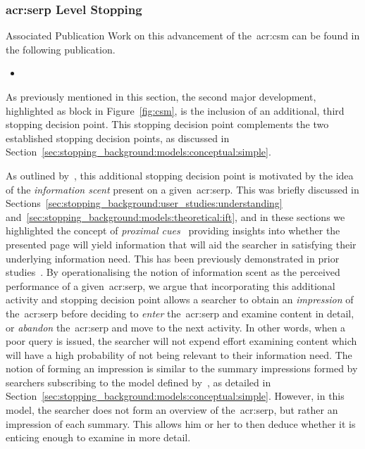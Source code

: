 \subsubsection{\gls{acr:serp} Level Stopping}\label{sec:csm:new_stopping}
\begin{publications_box}{Associated Publication}
Work on this advancement of the~\gls{acr:csm} can be found in the following publication.
\vspace*{-2mm}
\begin{itemize}
    \item{}
\end{itemize}
\end{publications_box}

As previously mentioned in this section, the second major development, highlighted as block  in Figure~\ref{fig:csm}, is the inclusion of an additional, third stopping decision point. This stopping decision point complements the two established stopping decision points, as discussed in Section~\ref{sec:stopping_background:models:conceptual:simple}.

As outlined by~\cite{maxwell2018serp}, this additional stopping decision point is motivated by the idea of the \emph{information scent} present on a given~\gls{acr:serp}. This was briefly discussed in Sections~\ref{sec:stopping_background:user_studies:understanding} and~\ref{sec:stopping_background:models:theoretical:ift}, and in these sections we highlighted the concept of \emph{proximal cues}~\citep{chi2001information_scent} providing insights into whether the presented page will yield information that will aid the searcher in satisfying their underlying information need. This has been previously demonstrated in prior studies~\citep{wu2014information_scent, ong2017scent_behaviour, maxwell2017snippets}. By operationalising the notion of information scent as the perceived performance of a given~\gls{acr:serp}, we argue that incorporating this additional activity and stopping decision point allows a searcher to obtain an \emph{impression} of the~\gls{acr:serp} before deciding to \emph{enter} the~\gls{acr:serp} and examine content in detail, or \emph{abandon} the~\gls{acr:serp} and move to the next activity. In other words, when a poor query is issued, the searcher will not expend effort examining content which will have a high probability of not being relevant to their information need. The notion of forming an impression is similar to the summary impressions formed by searchers subscribing to the model defined by~\cite{thomas2014modelling_behaviour}, as detailed in Section~\ref{sec:stopping_background:models:conceptual:simple}. However, in this model, the searcher does not form an overview of the~\gls{acr:serp}, but rather an impression of each summary. This allows him or her to then deduce whether it is enticing enough to examine in more detail.

